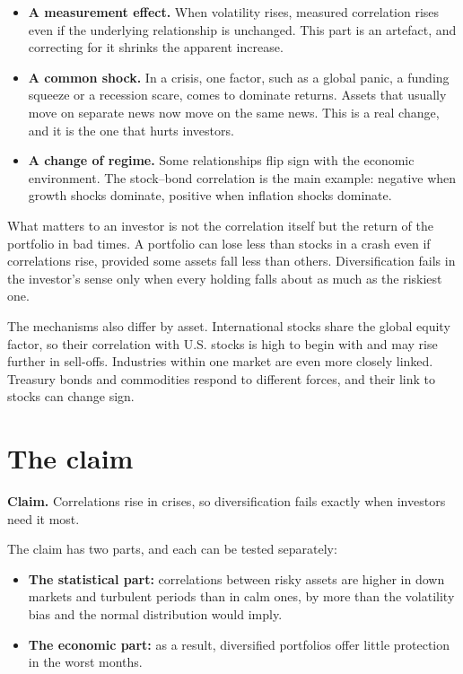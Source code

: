\begin{itemize}
  \item \textbf{A measurement effect.} When volatility rises, measured correlation rises even if the underlying relationship is unchanged. This part is an artefact, and correcting for it shrinks the apparent increase.
  \item \textbf{A common shock.} In a crisis, one factor, such as a global panic, a funding squeeze or a recession scare, comes to dominate returns. Assets that usually move on separate news now move on the same news. This is a real change, and it is the one that hurts investors.
  \item \textbf{A change of regime.} Some relationships flip sign with the economic environment. The stock--bond correlation is the main example: negative when growth shocks dominate, positive when inflation shocks dominate.
\end{itemize}

What matters to an investor is not the correlation itself but the return of the portfolio in bad times. A portfolio can lose less than stocks in a crash even if correlations rise, provided some assets fall less than others. Diversification fails in the investor's sense only when every holding falls about as much as the riskiest one.

The mechanisms also differ by asset. International stocks share the global equity factor, so their correlation with U.S. stocks is high to begin with and may rise further in sell-offs. Industries within one market are even more closely linked. Treasury bonds and commodities respond to different forces, and their link to stocks can change sign.

\section{The claim}
\label{sec:20-claim}

\begin{callout}
\textbf{Claim.} Correlations rise in crises, so diversification fails exactly when investors need it most.
\end{callout}

The claim has two parts, and each can be tested separately:

\begin{itemize}
  \item \textbf{The statistical part:} correlations between risky assets are higher in down markets and turbulent periods than in calm ones, by more than the volatility bias and the normal distribution would imply.
  \item \textbf{The economic part:} as a result, diversified portfolios offer little protection in the worst months.
\end{itemize}

